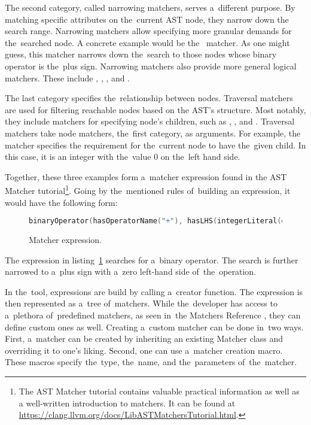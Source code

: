 The second category, called narrowing matchers, serves a~different purpose. 
By matching specific attributes on the~current AST node, they narrow down 
the search range. 
Narrowing matchers allow specifying more granular demands for the~searched 
node. 
A concrete example would be the~ matcher. 
As one might guess, this matcher narrows down the~search to those nodes 
whose binary operator is the~plus sign. 
Narrowing matchers also provide more general logical matchers. 
These include , , , 
and .

The last category specifies the~relationship between nodes. 
Traversal matchers are used for filtering reachable nodes based on 
the AST's structure. 
Most notably, they include matchers for specifying node's children, 
such as , , and . 
Traversal matchers take node matchers, the~first category, as arguments. 
For example, the~ matcher specifies
the requirement for the~current node to have the~given child. 
In this case, it is an integer with the~value 0 on the~left hand side.

Together, these three examples form a~matcher expression found in
the AST Matcher tutorial\footnote{The AST Matcher tutorial contains 
valuable practical information as well as a well-written introduction
to matchers. It can be found at 
\url{https://clang.llvm.org/docs/LibASTMatchersTutorial.html}.}. 
Going by the~mentioned rules of~building an expression, it would have 
the following form: 

\begin{figure}[H]\centering
\begin{lstlisting}[language=C++, numbers=none]
binaryOperator(hasOperatorName("+"), hasLHS(integerLiteral(equals(0)))).
\end{lstlisting}
\caption{Matcher expression.}
\label{lst:matcherexpr}
\end{figure}

The expression in listing~\ref{lst:matcherexpr} searches for a~binary 
operator. 
The search is further narrowed to a~plus sign with a~zero left-hand 
side of~the~operation.

In the~tool, expressions are build by calling a~creator function. 
The expression is then represented as a~tree of~matchers. 
While the~developer has access to a~plethora of~predefined matchers, 
as seen in~the Matchers Reference \citep{matchersreference:online}, 
they can define custom ones as well. 
Creating a~custom matcher can be done in~two ways. 
First, a~matcher can be created by inheriting an existing Matcher class 
and overriding it to one's liking. 
Second, one can use a~matcher creation macro. 
These macros specify the~type, the~name, and the~parameters of~the~matcher.

